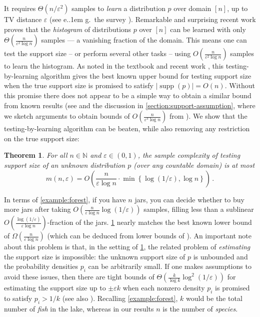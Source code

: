 \documentclass[10pt,a4paper]{article}
\newtheorem{theorem}{Theorem}[section]
\newcommand*\eg{e.\kern.1em g.\ }
\DeclareMathOperator{\supp}{supp}   %
\newcommand{\bN}{\ensuremath{\mathbb{N}}}
\renewcommand{\epsilon}{\varepsilon}
\begin{document}
It requires $\Theta(n/\epsilon^2)$ samples to \emph{learn} a distribution $p$ over domain $[n]$, up
to TV distance $\epsilon$ (see \eg the survey \cite{Can20}). Remarkable and surprising recent work
\cite{VV11stoc,VV17,HJW18,HO19pml} proves that the \emph{histogram} of distributions $p$ over $[n]$
can be learned with only $\Theta(\tfrac{n}{\epsilon^2 \log n})$ samples --- a vanishing fraction of
the domain. This means one can test the support size -- or perform several other tasks -- using
$O(\tfrac{n}{\epsilon^2 \log n})$ samples to learn the histogram.  As noted in the textbook
\cite{Gol17} and recent work \cite{GR23,AFL24}, this testing-by-learning algorithm gives the best
known upper bound for testing support size when the true support size is promised to satisfy
$|\supp(p)| = O(n)$. Without this promise there does not appear to be a simple way to obtain a
similar bound from known results (see \cite[pp.21]{GR23} and the discussion in
\cref{section:support-assumption}, where we sketch arguments to obtain bounds of
$O(\tfrac{n}{\epsilon^3 \log n})$ from \cite{VV16}). We show that the testing-by-learning algorithm
can be beaten, while also removing any restriction on the true support size:
\begin{theorem}
\label{res:intro-main}
For all $n \in \bN$ and $\epsilon \in (0,1)$, the sample complexity of testing support size of an
unknown distribution $p$ (over any countable domain) is at most
\[
  m(n,\epsilon) = O\left(\frac{n}{\epsilon \log n} \cdot \min\left\{ \log(1/\epsilon), \log n \right\} \right) \,.
\]
\end{theorem}
In terms of \cref{example:forest}, if you have $n$ jars, you can decide whether to buy more jars
after taking $O(\tfrac{n}{\epsilon \log n}\log(1/\epsilon))$ samples, filling
less than a sublinear $O(\tfrac{\log(1/\epsilon)}{\epsilon \log n})$-fraction of the jars.
\cref{res:intro-main} nearly matches the best known lower bound of $\Omega(\tfrac{n}{\epsilon \log
n})$ (which can be deduced from lower bounds of \cite{VV11stoc,WY19}). An important note about this
problem is that, in the setting of \cref{res:intro-main}, the related problem of \emph{estimating}
the support size is impossible: the unknown support size of $p$ is unbounded and the probability
densities $p_i$ can be arbitrarily small. If one makes assumptions to avoid these issues, then there
are tight bounds of $\Theta(\tfrac{k}{\log k} \log^2(1/\epsilon))$ for estimating the support size
up to $\pm \epsilon k$ when each nonzero density $p_i$ is promised to satisfy $p_i > 1/k$
\cite{WY19,HO19} (see also \cite{RRSS09,VV11stoc,ADOS17,VV17}). Recalling \cref{example:forest}, $k$
would be the total number of \emph{fish} in the lake, whereas in our results $n$ is the number of
\emph{species}.
\end{document}
